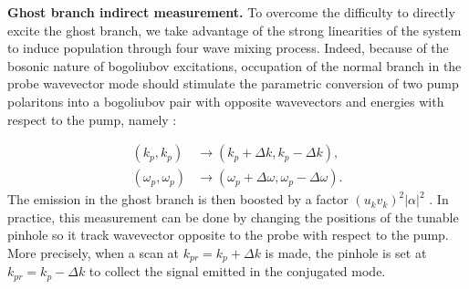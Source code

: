 \bigskip

 \textbf{Ghost branch indirect measurement.} To overcome the difficulty to directly excite the ghost branch, we take advantage of the strong linearities of the system to induce population
 through four wave mixing process. Indeed, because of the bosonic nature of bogoliubov excitations, occupation of the normal branch in the probe wavevector mode should stimulate the parametric conversion of two pump polaritons into a bogoliubov pair with opposite wavevectors and energies with respect to the pump, namely :

 \begin{subequations}
    \begin{align}
    (k_p, k_p) &\rightarrow (k_p+\Delta k, k_p-\Delta k),\\
    (\omega_p, \omega_p) &\rightarrow (\omega_p+\Delta \omega,\omega_p- \Delta \omega).
    \end{align}
 \end{subequations}
The emission in the ghost branch is then boosted by a factor $(u_kv_k)^2|\alpha|^2$ \cite{I_frerot_PRX_2023}. In practice, this measurement
can be done by changing the positions of the tunable pinhole so it track wavevector opposite to the probe with respect to the pump. More precisely,
when a scan at $k_{pr}=k_p+\Delta k$ is made, the pinhole is set at $k_{pr}=k_p-\Delta k$ to collect the signal emitted in the conjugated mode. 

\bigskip

